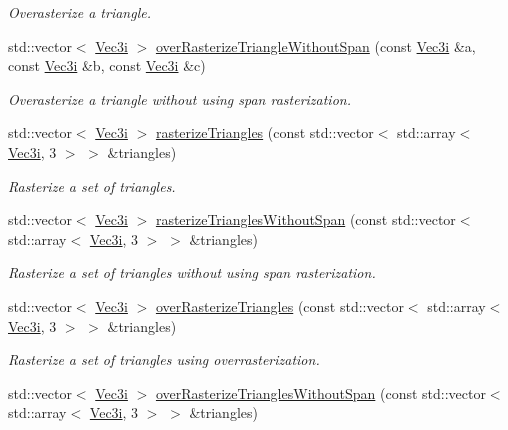 \begin{DoxyCompactItemize}
\begin{DoxyCompactList}\small\item\em Overasterize a triangle. \end{DoxyCompactList}\item 
std\+::vector$<$ \hyperlink{classhokusai_1_1Vec3}{Vec3i} $>$ \hyperlink{namespacehokusai_a053b66319b2116e927656ab307477c22}{over\+Rasterize\+Triangle\+Without\+Span} (const \hyperlink{classhokusai_1_1Vec3}{Vec3i} \&a, const \hyperlink{classhokusai_1_1Vec3}{Vec3i} \&b, const \hyperlink{classhokusai_1_1Vec3}{Vec3i} \&c)
\begin{DoxyCompactList}\small\item\em Overasterize a triangle without using span rasterization. \end{DoxyCompactList}\item 
std\+::vector$<$ \hyperlink{classhokusai_1_1Vec3}{Vec3i} $>$ \hyperlink{namespacehokusai_a4d597e2380c1b9e5a93371bb92e892df}{rasterize\+Triangles} (const std\+::vector$<$ std\+::array$<$ \hyperlink{classhokusai_1_1Vec3}{Vec3i}, 3 $>$ $>$ \&triangles)
\begin{DoxyCompactList}\small\item\em Rasterize a set of triangles. \end{DoxyCompactList}\item 
std\+::vector$<$ \hyperlink{classhokusai_1_1Vec3}{Vec3i} $>$ \hyperlink{namespacehokusai_ab849919f8d3aca8972df9b30bbf8e517}{rasterize\+Triangles\+Without\+Span} (const std\+::vector$<$ std\+::array$<$ \hyperlink{classhokusai_1_1Vec3}{Vec3i}, 3 $>$ $>$ \&triangles)
\begin{DoxyCompactList}\small\item\em Rasterize a set of triangles without using span rasterization. \end{DoxyCompactList}\item 
std\+::vector$<$ \hyperlink{classhokusai_1_1Vec3}{Vec3i} $>$ \hyperlink{namespacehokusai_a6540197c1b57799b32cc2a8a80a909a8}{over\+Rasterize\+Triangles} (const std\+::vector$<$ std\+::array$<$ \hyperlink{classhokusai_1_1Vec3}{Vec3i}, 3 $>$ $>$ \&triangles)
\begin{DoxyCompactList}\small\item\em Rasterize a set of triangles using overrasterization. \end{DoxyCompactList}\item 
std\+::vector$<$ \hyperlink{classhokusai_1_1Vec3}{Vec3i} $>$ \hyperlink{namespacehokusai_a82a292ebe0ee34eedc3a237e29a3ebee}{over\+Rasterize\+Triangles\+Without\+Span} (const std\+::vector$<$ std\+::array$<$ \hyperlink{classhokusai_1_1Vec3}{Vec3i}, 3 $>$ $>$ \&triangles)

\end{DoxyCompactItemize}
